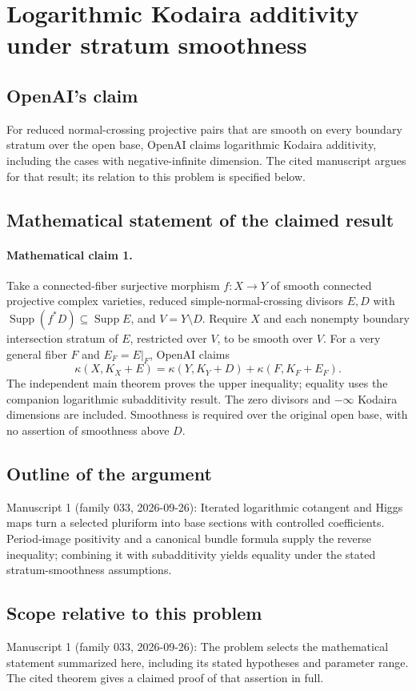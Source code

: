 \documentclass[11pt]{article}
\begin{document}
\section*{Logarithmic Kodaira additivity under stratum smoothness}

\subsection{OpenAI's claim}
For reduced normal-crossing projective pairs that are smooth on every boundary stratum over the open base, OpenAI claims logarithmic Kodaira additivity, including the cases with negative-infinite dimension. The cited manuscript argues for that result; its relation to this problem is specified below.

\subsection{Mathematical statement of the claimed result}
\paragraph{Mathematical claim 1.} Take a connected-fiber surjective morphism $f:X\to Y$ of smooth connected projective complex varieties, reduced simple-normal-crossing divisors $E,D$ with $\operatorname{Supp}(f^*D)\subseteq\operatorname{Supp}E$, and $V=Y\setminus D$. Require $X$ and each nonempty boundary intersection stratum of $E$, restricted over $V$, to be smooth over $V$. For a very general fiber $F$ and $E_F=E|_F$, OpenAI claims
\[
\kappa(X,K_X+E)=\kappa(Y,K_Y+D)+\kappa(F,K_F+E_F).
\]
The independent main theorem proves the upper inequality; equality uses the companion logarithmic subadditivity result. The zero divisors and $-\infty$ Kodaira dimensions are included. Smoothness is required over the original open base, with no assertion of smoothness above $D$.

\subsection{Outline of the argument}
Manuscript 1 (family 033, 2026-09-26): Iterated logarithmic cotangent and Higgs maps turn a selected pluriform into base sections with controlled coefficients. Period-image positivity and a canonical bundle formula supply the reverse inequality; combining it with subadditivity yields equality under the stated stratum-smoothness assumptions.

\subsection{Scope relative to this problem}
Manuscript 1 (family 033, 2026-09-26): The problem selects the mathematical statement summarized here, including its stated hypotheses and parameter range. The cited theorem gives a claimed proof of that assertion in full.
\end{document}
